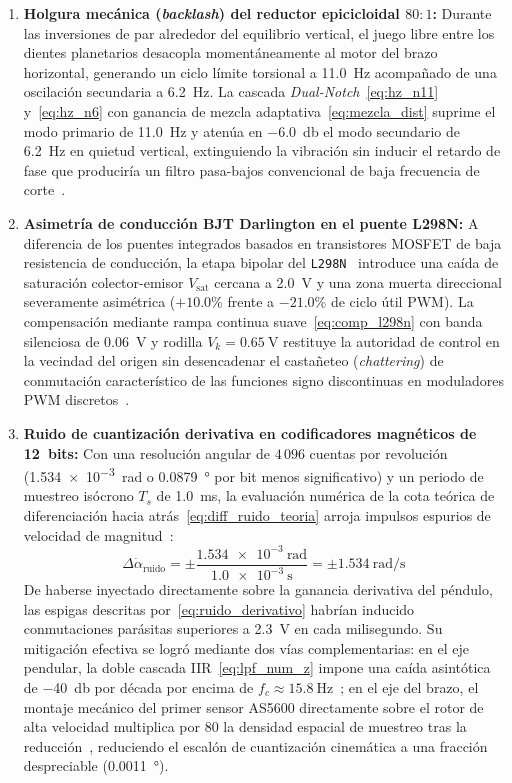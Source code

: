 \begin{enumerate}
    \item \textbf{Holgura mecánica (\textit{backlash}) del reductor epicicloidal $80:1$:} Durante las inversiones de par alrededor del equilibrio vertical, el juego libre entre los dientes planetarios desacopla momentáneamente al motor del brazo horizontal, generando un ciclo límite torsional a \qty{11.0}{\hertz} acompañado de una oscilación secundaria a \qty{6.2}{\hertz}. La cascada \textit{Dual-Notch}~\eqref{eq:hz_n11} y~\eqref{eq:hz_n6} con ganancia de mezcla adaptativa~\eqref{eq:mezcla_dist} suprime el modo primario de \qty{11.0}{\hertz} y atenúa en \qty{-6.0}{\decibel} el modo secundario de \qty{6.2}{\hertz} en quietud vertical, extinguiendo la vibración sin inducir el retardo de fase que produciría un filtro pasa-bajos convencional de baja frecuencia de corte~\cite{Oppenheim2010}.
    \item \textbf{Asimetría de conducción BJT Darlington en el puente L298N:} A diferencia de los puentes integrados basados en transistores MOSFET de baja resistencia de conducción, la etapa bipolar del \texttt{L298N}~\cite{L298N_Datasheet} introduce una caída de saturación colector-emisor $V_{\text{sat}}$ cercana a \qty{2.0}{\volt} y una zona muerta direccional severamente asimétrica ($+10.0\%$ frente a $-21.0\%$ de ciclo útil PWM). La compensación mediante rampa continua suave~\eqref{eq:comp_l298n} con banda silenciosa de \qty{0.06}{\volt} y rodilla $V_k=\qty{0.65}{\volt}$ restituye la autoridad de control en la vecindad del origen sin desencadenar el castañeteo (\textit{chattering}) de conmutación característico de las funciones signo discontinuas en moduladores PWM discretos~\cite{Petric2022}.
    \item \textbf{Ruido de cuantización derivativa en codificadores magnéticos de 12~bits:} Con una resolución angular de $4\,096$ cuentas por revolución (\qty{1.534e-3}{\radian} o \qty{0.0879}{\degree} por bit menos significativo) y un periodo de muestreo isócrono $T_s$ de \qty{1.0}{\milli\second}, la evaluación numérica de la cota teórica de diferenciación hacia atrás~\eqref{eq:diff_ruido_teoria} arroja impulsos espurios de velocidad de magnitud~\cite{Merry2010}:
    \begin{equation}
    \Delta\dot{\alpha}_{\text{ruido}} = \pm \frac{\qty{1.534e-3}{\radian}}{\qty{1.0e-3}{\second}} = \pm\qty{1.534}{\radian\per\second}
    \label{eq:ruido_derivativo}
    \end{equation}
    De haberse inyectado directamente sobre la ganancia derivativa del péndulo, las espigas descritas por~\eqref{eq:ruido_derivativo} habrían inducido conmutaciones parásitas superiores a \qty{2.3}{\volt} en cada milisegundo. Su mitigación efectiva se logró mediante dos vías complementarias: en el eje pendular, la doble cascada IIR~\eqref{eq:lpf_num_z} impone una caída asintótica de \qty{-40}{\decibel} por década por encima de $f_c\approx\qty{15.8}{\hertz}$~\cite{Oppenheim2010}; en el eje del brazo, el montaje mecánico del primer sensor AS5600 directamente sobre el rotor de alta velocidad multiplica por $80$ la densidad espacial de muestreo tras la reducción~\cite{ams2018}, reduciendo el escalón de cuantización cinemática a una fracción despreciable (\qty{0.0011}{\degree}).

\end{enumerate}
